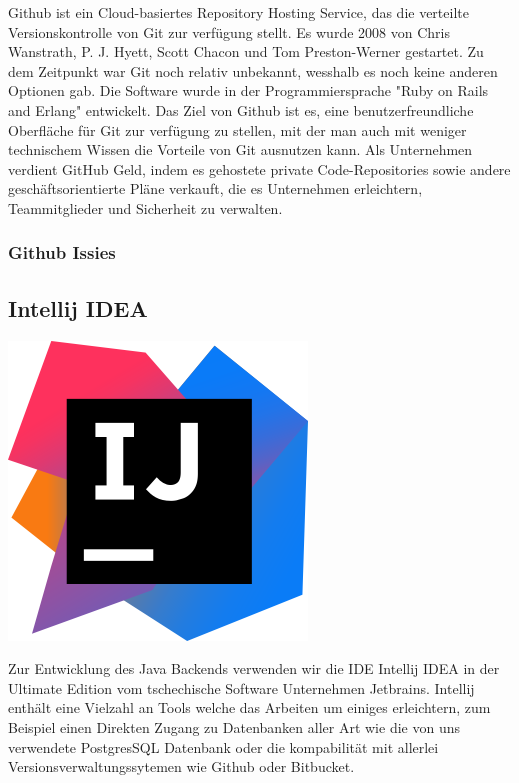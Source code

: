 Github ist ein Cloud-basiertes Repository Hosting Service, das die verteilte Versionskontrolle von Git zur verfügung stellt. Es wurde 2008 von Chris Wanstrath, P. J. Hyett, 
Scott Chacon und Tom Preston-Werner gestartet. Zu dem Zeitpunkt war Git noch relativ unbekannt, wesshalb es noch keine anderen Optionen gab. Die Software wurde in der 
Programmiersprache "Ruby on Rails and Erlang" entwickelt. 
\cite{sysarch-github-1}
Das Ziel von Github ist es, eine benutzerfreundliche Oberfläche für Git zur verfügung zu stellen, mit der man auch mit weniger technischem Wissen die Vorteile von Git ausnutzen kann.
\cite{sysarch-github-2}
Als Unternehmen verdient GitHub Geld, indem es gehostete private Code-Repositories sowie andere geschäftsorientierte Pläne verkauft, 
die es Unternehmen erleichtern, Teammitglieder und Sicherheit zu verwalten.
\cite{sysarch-github-2}

\subsubsection{Github Issies}




\subsection{Intellij IDEA}
\includegraphics[scale=0.05]{pics/intellijIdeaLogo.png}


Zur Entwicklung des Java Backends verwenden wir die IDE Intellij IDEA in der Ultimate Edition vom tschechische 
Software Unternehmen Jetbrains. Intellij enthält eine Vielzahl an Tools welche das Arbeiten um einiges erleichtern, 
zum Beispiel einen Direkten Zugang zu Datenbanken aller Art wie die von uns verwendete PostgresSQL Datenbank 
oder die kompabilität mit allerlei Versionsverwaltungssytemen wie Github oder Bitbucket.


